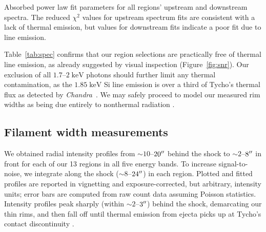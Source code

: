 \documentclass[iop, apj, numberedappendix, twocolappendix]{emulateapj}
\newcommand*{\mt}{\mathrm}
\newcommand*{\unit}[1]{\;\mt{#1}}  %
\newcommand*{\abt}{\mathord{\sim}} %
\newcommand*{\Chandra}{\textit{Chandra}\ }
\begin{document}
\begin{table}
    \scriptsize
    \centering
    \caption{Absorbed power law fit parameters for all regions' upstream and
    downstream spectra.  The reduced $\chi^2$ values for upstream spectrum fits
    are consistent with a lack of thermal emission, but values for downstream
    fits indicate a poor fit due to line emission.
    \label{tab:spec}}
    
\end{table}

Table~\ref{tab:spec} confirms that our region selections are practically free
of thermal line emission, as already suggested by visual inspection
(Figure~\ref{fig:snr}).  Our exclusion of all $1.7$--$2
\unit{keV}$ photons should further limit any thermal contamination, as
the $1.85 \unit{keV}$ Si line emission is over a third of Tycho's thermal flux
as detected by \Chandra \citep{hwang2002}.  We may safely proceed to model our
measured rim widths as being due entirely to nonthermal radiation
.

\subsection{Filament width measurements}
\label{sec:fwhms}

We obtained radial intensity profiles from $\abt 10$--$20\mbox{$^{\prime\prime}$}$ behind the
shock to $\abt 2$--$8\mbox{$^{\prime\prime}$}$ in front for each of our 13 regions in all five
energy bands.  To increase signal-to-noise, we integrate along the shock ($\abt
8$--$24\mbox{$^{\prime\prime}$}$) in each region.  Plotted and fitted profiles are reported in
vignetting and exposure-corrected, but arbitrary, intensity units; error bars
are computed from raw count data assuming Poisson statistics.  Intensity
profiles peak sharply (within $\abt 2$--$3\mbox{$^{\prime\prime}$}$) behind the shock,
demarcating our thin rims, and then fall off until thermal emission from ejecta
picks up at Tycho's contact discontinuity \citep{warren2005}.
\end{document}
